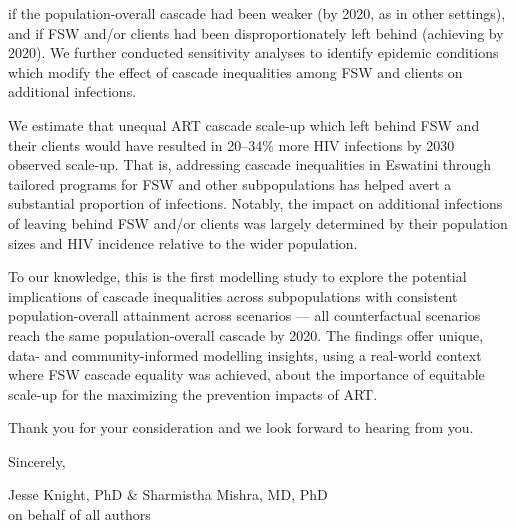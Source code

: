 if the population-overall cascade had been weaker (\casmd by 2020, as in other settings),
and if FSW and/or clients had been disproportionately left behind (achieving \caslo by 2020).
We further conducted sensitivity analyses to identify epidemic conditions which modify
the effect of cascade inequalities among FSW and clients on additional infections.
\par
We estimate that unequal ART cascade scale-up which left behind FSW and their clients
would have resulted in 20--34\% more HIV infections by 2030 \vs observed scale-up.
That is, addressing cascade inequalities in Eswatini
through tailored programs for FSW and other subpopulations
has helped avert a substantial proportion of infections.
Notably, the impact on additional infections of
leaving behind FSW and/or clients was largely determined by
their population sizes and HIV incidence relative to the wider population.
\par\pagebreak %
To our knowledge, this is the first modelling study to explore
the potential implications of cascade inequalities across subpopulations
with consistent population-overall attainment across scenarios ---
\ie all counterfactual scenarios reach the same population-overall cascade by 2020.
The findings offer unique, data- and community-informed modelling insights,
using a real-world context where FSW cascade equality was achieved,
about the importance of equitable scale-up
for the maximizing the prevention impacts of ART.
\par
Thank you for your consideration and we look forward to hearing from you.
\medskip\par
Sincerely,
\par
Jesse Knight, PhD \& Sharmistha Mishra, MD, PhD\\
on behalf of all authors
